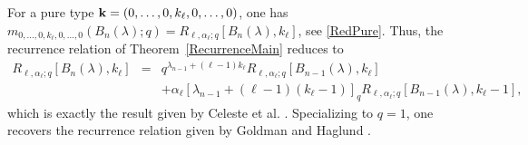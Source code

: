 \documentclass[10pt]{amsart}
\begin{document}
For a pure type ${\bf k}= (0,\ldots,0,k_{\ell},0,\ldots,0)$, one has $
m_{0,\ldots,0,k_{\ell},0,\ldots,0}(B_{n}(\lambda);q)= R_{\ell, \alpha_{\ell};q}[B_{n}(\lambda),k_{\ell}]$, see \eqref{RedPure}. Thus, the recurrence relation of Theorem~\ref{RecurrenceMain} reduces to
\begin{eqnarray*}
R_{\ell, \alpha_{\ell};q}[B_{n}(\lambda),k_{\ell}] &=& q^{\lambda_{n-1}+(\ell-1)k_{\ell}} R_{\ell, \alpha_{\ell};q}[B_{n-1}(\lambda),k_{\ell}] \\ && +\alpha_{\ell}[\lambda_{n-1}+(\ell-1)(k_{\ell}-1)]_q R_{\ell, \alpha_{\ell};q}[B_{n-1}(\lambda),k_{\ell}-1],
\end{eqnarray*}
which is exactly the result given by Celeste et al. \cite[Theorem 7]{CCG2017}. Specializing to $q=1$, one recovers the recurrence relation given by Goldman and Haglund \cite[Equation (3)]{JGJH2000}. 
\end{document}
